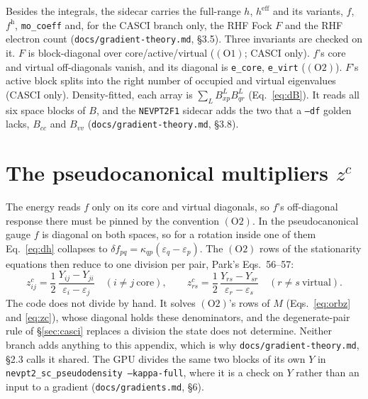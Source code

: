\documentclass[11pt]{article}
\newcommand{\code}[1]{\texttt{#1}}
\newcommand{\eps}{\varepsilon}
\newcommand{\heff}{h^{\mathrm{eff}}}
\newcommand{\cons}[1]{\ensuremath{(\mathrm{#1})}}
\begin{document}
Besides the integrals, the sidecar carries the full-range $h$, $\heff$ and its
variants, $f$, $f^{\mathrm h}$, \code{mo\_coeff} and, for the CASCI branch
only, the RHF Fock $F$ and the RHF electron count
(\code{docs/gradient-theory.md}, \S3.5). Three invariants are checked on it.
$F$ is block-diagonal over core/active/virtual (\cons{O1}; CASCI only). $f$'s
core and virtual off-diagonals vanish, and its diagonal is \code{e\_core},
\code{e\_virt} (\cons{O2}). $F$'s active block splits into the right number of
occupied and virtual eigenvalues (CASCI only). Density-fitted, each array is
$\sum_L B^L_{xp}B^L_{qr}$ (Eq.~\eqref{eq:dB}). It reads all six space blocks
of $B$, and the \code{NEVPT2F1} sidecar adds the two that a \code{--df} golden
lacks, $B_{cc}$ and $B_{vv}$ (\code{docs/gradient-theory.md}, \S3.8).

\section{\texorpdfstring{The pseudocanonical multipliers $z^c$}{The pseudocanonical multipliers z\^{}c}}
\label{app:z}

The energy reads $f$ only on its core and virtual diagonals, so $f$'s
off-diagonal response there must be pinned by the convention \cons{O2}. In the
pseudocanonical gauge $f$ is diagonal on both spaces, so for a rotation inside
one of them Eq.~\eqref{eq:dh} collapses to $\delta f_{pq} =
\kappa_{qp}(\eps_q - \eps_p)$. The \cons{O2} rows of the stationarity
equations then reduce to one division per pair, Park's Eqs.~56--57:
\begin{equation}
  z^c_{ij} = \frac12\,\frac{Y_{ij} - Y_{ji}}{\eps_i - \eps_j}\quad(i\ne j\ \text{core}),\qquad
  z^c_{rs} = \frac12\,\frac{Y_{rs} - Y_{sr}}{\eps_r - \eps_s}\quad(r\ne s\ \text{virtual}).
  \label{eq:z5657}
\end{equation}
The code does not divide by hand. It solves \cons{O2}'s rows of $M$
(Eqs.~\eqref{eq:orbz} and \eqref{eq:zc}), whose diagonal holds these
denominators, and the degenerate-pair rule of \S\ref{sec:casci} replaces a
division the state does not determine. Neither branch adds anything to this
appendix, which is why \code{docs/gradient-theory.md}, \S2.3 calls it shared.
The GPU divides the same two blocks of its own $Y$ in
\code{nevpt2\_sc\_pseudodensity --kappa-full}, where it is a check on $Y$
rather than an input to a gradient (\code{docs/gradients.md}, \S6).
\end{document}
